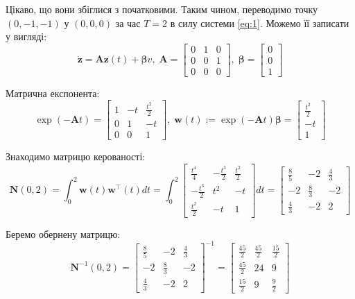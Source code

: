 \documentclass[oneside,solution]{karazin-control-assign}
\begin{document}
Цікаво, що вони збіглися з початковими. Таким чином, переводимо точку $(0,-1,-1)$ у $(0,0,0)$ за час $T=2$ в силу системи \ref{eq:1}. Можемо її записати у вигляді:
\begin{equation}
    \dot{\mathbf{z}} = \boldsymbol{A}\mathbf{z}(t) + \boldsymbol{\beta}v, \; \boldsymbol{A} = \begin{bmatrix}
        0 & 1 & 0 \\
        0 & 0 & 1 \\
        0 & 0 & 0
    \end{bmatrix}, \; \boldsymbol{\beta} = \begin{bmatrix}
        0 \\ 0 \\ 1
    \end{bmatrix}
\end{equation}

Матрична експонента:
\begin{equation}
    \exp(-\mathbf{A}t) = \begin{bmatrix}
        1 & -t & \frac{t^2}{2} \\
        0 & 1 & -t \\
        0 & 0 & 1
    \end{bmatrix}, \; \mathbf{w}(t) := \exp(-\mathbf{A}t)\boldsymbol{\beta} = \begin{bmatrix}
        \frac{t^2}{2} \\ -t \\ 1
    \end{bmatrix}
\end{equation}

Знаходимо матрицю керованості:
\begin{equation}
    \boldsymbol{N}(0,2) = \int_0^2 \mathbf{w}(t)\mathbf{w}^{\top}(t)dt = \int_0^2\begin{bmatrix}
        \frac{t^4}{4} & -\frac{t^3}{2} & \frac{t^2}{2} \\
        -\frac{t^3}{2} & t^2 & -t \\
        \frac{t^2}{2} & -t & 1
    \end{bmatrix}dt = \begin{bmatrix}
        \frac{8}{5} & -2 & \frac{4}{3} \\
        -2 & \frac{8}{3} & -2 \\
        \frac{4}{3} & -2 & 2
    \end{bmatrix}
\end{equation}

Беремо обернену матрицю:
\begin{equation}
    \boldsymbol{N}^{-1}(0,2) = \begin{bmatrix}
        \frac{8}{5} & -2 & \frac{4}{3} \\
        -2 & \frac{8}{3} & -2 \\
        \frac{4}{3} & -2 & 2
    \end{bmatrix}^{-1} = \begin{bmatrix}
        \frac{45}{2} & \frac{45}{2} & \frac{15}{2} \\
        \frac{45}{2} & 24 & 9 \\
        \frac{15}{2} & 9 & \frac{9}{2}
    \end{bmatrix}
\end{equation}
\end{document}
